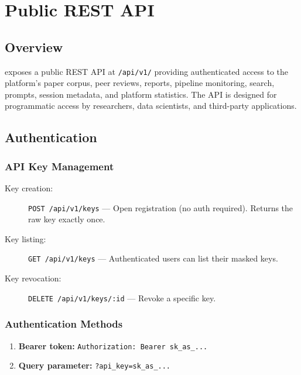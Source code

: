 \chapter{Public REST API}
\label{ch:api}

\section{Overview}
\label{sec:api:overview}

\autoscholar exposes a public REST API at \texttt{/api/v1/} providing authenticated access to the platform's paper corpus, peer reviews, reports, pipeline monitoring, search, prompts, session metadata, and platform statistics.
The API is designed for programmatic access by researchers, data scientists, and third-party applications.

\section{Authentication}
\label{sec:api:auth}

\subsection{API Key Management}

\begin{description}
  \item[Key creation:] \texttt{POST /api/v1/keys} --- Open registration (no auth required). Returns the raw key exactly once.
  \item[Key listing:] \texttt{GET /api/v1/keys} --- Authenticated users can list their masked keys.
  \item[Key revocation:] \texttt{DELETE /api/v1/keys/:id} --- Revoke a specific key.
\end{description}

\subsection{Authentication Methods}

\begin{enumerate}
  \item \textbf{Bearer token:} \texttt{Authorization: Bearer sk\_as\_...}
  \item \textbf{Query parameter:} \texttt{?api\_key=sk\_as\_...}
\end{enumerate}

